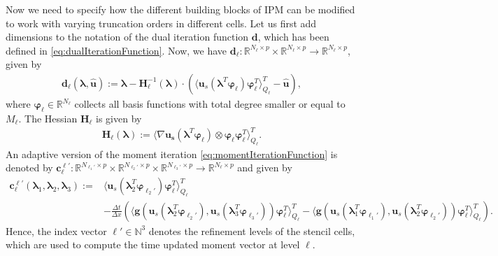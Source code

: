 Now we need to specify how the different building blocks of IPM can be modified to work with varying truncation orders in different cells. Let us first add dimensions to the notation of the dual iteration function $\bm d$, which has been defined in \eqref{eq:dualIterationFunction}. Now, we have 
$\bm{d}_{\ell}:\mathbb{R}^{N_{\ell}\times p}\times\mathbb{R}^{N_{\ell}\times p}\to\mathbb{R}^{N_{\ell}\times p}$, given by
\begin{align}\label{eq:dualIterationFunctionAd}
\bm{d}_{\ell}(\bm{\lambda},\bm{\hat{u}}):= \bm{\lambda}-\bm{H}_{\ell}^{-1}(\bm{\lambda})\cdot \left(\langle \bm u_{s}(\bm{\lambda}^T\bm{\varphi}_{\ell})\bm{\varphi}_{\ell}^T\rangle_{Q_{\ell}}^T-\bm{\hat{u}}\right),
\end{align}
where $\bm{\varphi}_{\ell}\in\mathbb{R}^{N_{\ell}}$ collects all basis functions with total degree smaller or equal to $M_\ell$. The Hessian $\bm{H}_{\ell}$ is given by 
\begin{align*}
\bm{H}_{\ell}(\bm{\lambda}) := \langle \nabla \bm{u}_{\bm{s}} (\bm{\lambda}^T\bm{\varphi}_{\ell})\otimes\bm{\varphi}_{\ell}\bm{\varphi}_{\ell}^T\rangle_{Q_{\ell}}^{T}.
\end{align*}
An adaptive version of the moment iteration \eqref{eq:momentIterationFunction} is denoted by $\bm c_{\ell}^{\bm{\ell}'}:\mathbb{R}^{N_{\ell_1'}\times p}\times \mathbb{R}^{N_{\ell_2'}\times p}\times \mathbb{R}^{N_{\ell_3'}\times p}\rightarrow \mathbb{R}^{N_{\ell}\times p}$ and given by
\begin{align}\label{eq:adaptiveFVUpdate}
\bm{c}_{\ell}^{\bm{\ell}'}\left(\bm{\lambda}_{1},\bm{\lambda}_2,\bm{\lambda}_3\right):= &\langle \bm u_{s}(\bm{\lambda}_2^T\bm{\varphi}_{\ell_2'})\bm{\varphi}_{\ell}^T\rangle_{Q_{\ell}}^T \\&- \frac{\Delta t}{\Delta x}\left(\langle \bm g(\bm u_{s}(\bm{\lambda}_2^T\bm{\varphi}_{\ell_2'}),\bm u_{s}(\bm{\lambda}_3^T\bm{\varphi}_{\ell_3'}))\bm{\varphi}_{\ell}^T\rangle_{Q_{\ell}}^T-\langle \bm g(\bm u_{s}(\bm{\lambda}_{1}^T\bm{\varphi}_{\ell_1'}),\bm u_{s}(\bm{\lambda}_2^T\bm{\varphi}_{\ell_2'}))\bm{\varphi}_{\ell}^T\rangle_{Q_{\ell}}^T\right). \nonumber
\end{align}
Hence, the index vector $\bm\ell'\in\mathbb{N}^{3}$ denotes the refinement levels of the stencil cells, which are used to compute the time updated moment vector at level $\ell$.

